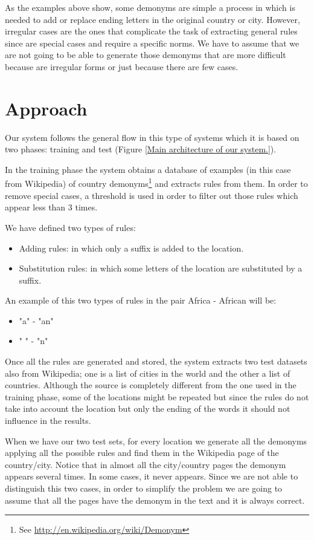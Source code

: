 \documentclass[]{report}
\begin{document}
As the examples above show, some demonyms are simple a process in which is needed to add or replace ending letters in the original country or city. However, irregular cases are the ones that complicate the task of extracting general rules since are special cases and require a specific norms. We have to assume that we are not going to be able to generate those demonyms that are more difficult because are irregular forms or just because there are few cases.


\newpage
\section{Approach}


Our system follows the general flow in this type of systems which it is based on two phases: training and test (Figure \ref{Main architecture of our system.}). 

In the training phase the system obtains a database of examples (in this case from Wikipedia) of country demonyms\footnote{See \href{Wikipedia Demonym page}{http://en.wikipedia.org/wiki/Demonym}} and extracts rules from them.
In order to remove special cases, a threshold is used in order to filter out those rules which appear less than 3 times.

We have defined two types of rules:
\begin{itemize}
\item Adding rules: in which only a suffix is added to the location.
\item Substitution rules: in which some letters of the location are substituted by a suffix.
\end{itemize}

An example of this two types of rules in the pair Africa - African will be:
\begin{itemize}
\item "a" - "an"
\item " " - "n"
\end{itemize}

Once all the rules are generated and stored, the system extracts two test datasets also from Wikipedia; one is a list of cities in the world and the other a list of countries. Although the source is completely different from the one used in the training phase, some of the locations might be repeated but since the rules do not take into account the location but only the ending of the words it should not influence in the results.

When we have our two test sets, for every location we generate all the demonyms applying all the possible rules and find them in the Wikipedia page of the country/city. Notice that in almost all the city/country pages the demonym appears several times. In some cases, it never appears. Since we are not able to distinguish this two cases, in order to simplify the problem we are going to assume that all the pages have the demonym in the text and it is always correct. 
\end{document}
